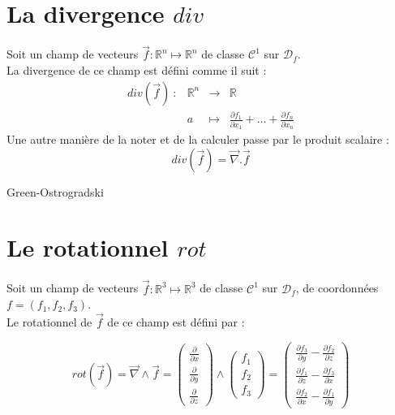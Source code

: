 \section{La divergence $div$}
\begin{defi}
Soit un champ de vecteurs $\overrightarrow{f}:\mathbb{R}^n\mapsto\mathbb{R}^n$ de classe $\mathscr{C}^1$ sur $\mathscr{D}_f$.\\
La divergence de ce champ est défini comme il suit :
$$\begin{array}{cccc}
    div(\overrightarrow{f}) \ : & \mathbb{R}^n & \to & \mathbb{R} \\
         & a & \mapsto & \frac{\partial f_1}{\partial x_1}+\hdots+\frac{\partial f_n}{\partial x_n}
\end{array}$$
Une autre manière de la noter et de la calculer passe par le produit scalaire :
$$div(\overrightarrow{f})=\overrightarrow{\nabla}.\overrightarrow{f}$$
\end{defi}
\begin{thm}
Green-Ostrogradski
\end{thm}
\section{Le rotationnel $rot$}
\begin{defi}
Soit un champ de vecteurs $\overrightarrow{f}:\mathbb{R}^3\mapsto\mathbb{R}^3$ de classe $\mathscr{C}^1$ sur $\mathscr{D}_f$, de coordonnées\\ $f=(f_1,f_2,f_3)$.\\
Le rotationnel de $\overrightarrow{f}$ de ce champ est défini par :

$$rot(\overrightarrow{f})=\overrightarrow{\nabla}\land\overrightarrow{f}=\begin{pmatrix}\frac{\partial}{\partial x}\\\frac{\partial}{\partial y}\\\frac{\partial}{\partial z}\end{pmatrix}\land\begin{pmatrix}f_1\\f_2\\f_3\end{pmatrix}=\begin{pmatrix}\frac{\partial f_3}{\partial y}-\frac{\partial f_2}{\partial z}\\\frac{\partial f_1}{\partial z}-\frac{\partial f_3}{\partial x}\\\frac{\partial f_2}{\partial x}-\frac{\partial f_1}{\partial y}\end{pmatrix}$$
\end{defi}

